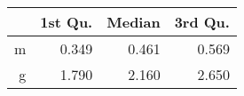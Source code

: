 \begin{table}[ht]
\centering
\begin{tabular}{rrrr}
  \hline
 & 1st Qu. & Median & 3rd Qu. \\ 
  \hline
m & 0.349 & 0.461 & 0.569 \\ 
  g & 1.790 & 2.160 & 2.650 \\ 
   \hline
\end{tabular}
\end{table}
